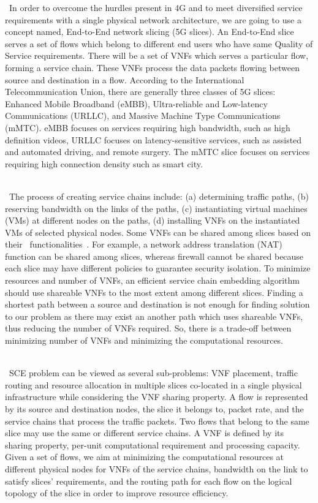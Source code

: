 \documentclass{article}
\begin{document}
 In order to overcome the hurdles present in 4G and to meet diversified service requirements with a single physical network architecture, we are going to use a concept named, End-to-End network slicing (5G slices). An End-to-End slice serves a set of flows which belong to different end users who have same Quality of Service requirements. There will be a set of VNFs which serves a particular flow, forming a service chain. These VNFs process the data packets flowing between source and destination in a flow. According to the International Telecommunication Union, there are generally three classes of 5G slices: Enhanced Mobile Broadband (eMBB), Ultra-reliable and Low-latency Communications (URLLC), and Massive Machine Type Communications (mMTC). eMBB focuses on services requiring high bandwidth, such as high definition videos, URLLC focuses on latency-sensitive services, such as assisted and automated driving, and remote surgery. The mMTC slice focuses on services requiring high connection density such as smart city.\\
 
 \par
 The process of creating service chains include: (a) determining traffic paths, (b) reserving bandwidth on the links of the paths, (c) instantiating virtual machines (VMs) at different nodes on the paths, (d) installing VNFs on the instantiated VMs of selected physical nodes. Some VNFs can be shared among slices based on their  functionalities . For example, a network address translation (NAT) function can be shared among slices, whereas firewall cannot be shared because each slice may have different policies to guarantee security isolation. To minimize resources and number of VNFs, an efficient service chain embedding algorithm should use shareable VNFs to the most extent among different slices. Finding a shortest path between a source and destination is not enough for finding solution to our problem as there may exist an another path which uses shareable VNFs, thus reducing the number of VNFs required. So, there is a trade-off between minimizing number of VNFs and minimizing the computational resources.\\
 
 \par
 SCE problem can be viewed as several sub-problems: VNF placement, traffic routing and resource allocation in multiple slices co-located in a single physical infrastructure while considering the VNF sharing property. A flow is represented by its source and destination nodes, the slice it belongs to, packet rate, and the service chains that process the traffic packets. Two flows that belong to the same slice may use the same or different service chains. A VNF is defined by its sharing property, per-unit computational requirement and processing capacity. Given a set of flows, we aim at minimizing the computational resources at different physical nodes for VNFs of the service chains, bandwidth on the link to satisfy slices' requirements, and the routing path for each flow on the logical topology of the slice in order to improve resource efficiency.
	
\end{document}
